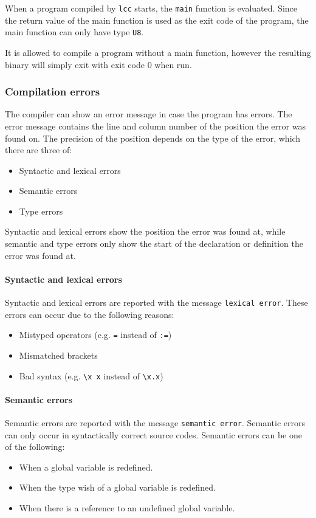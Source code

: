 \documentclass[12pt]{article}
\begin{document}
When a program compiled by \verb$lcc$ starts, the \verb$main$ function is
evaluated. Since the return value of the main function is used as the exit code
of the program, the main function can only have type \verb$U8$.

It is allowed to compile a program without a main function, however the
resulting binary will simply exit with exit code 0 when run.

\subsubsection{Compilation errors}

The compiler can show an error message in case the program has errors. The error
message contains the line and column number of the position the error was found
on. The precision of the position depends on the type of the error, which
there are three of:
\begin{itemize}
    \item Syntactic and lexical errors
    \item Semantic errors
    \item Type errors
\end{itemize}

Syntactic and lexical errors show the position the error was found at, while
semantic and type errors only show the start of the declaration or definition
the error was found at.

\paragraph{Syntactic and lexical errors} Syntactic and lexical errors are
reported with the message \verb$lexical error$. These errors can occur due to
the following reasons:
\begin{itemize}
    \item Mistyped operators (e.g. \verb$=$ instead of \verb$:=$)
    \item Mismatched brackets 
    \item Bad syntax (e.g. \verb$\x x$ instead of \verb$\x.x$)
\end{itemize}

\paragraph{Semantic errors} Semantic errors are reported with the message
\verb$semantic error$. Semantic errors can only occur in syntactically correct
source codes. Semantic errors can be one of the following:
\begin{itemize}
    \item When a global variable is redefined.
    \item When the type wish of a global variable is redefined.
    \item When there is a reference to an undefined global variable. 
\end{itemize}
\end{document}
